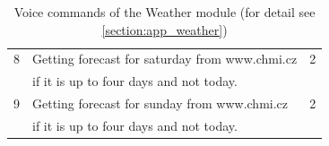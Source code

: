 \begin{table}[H]
{\begin{tabular}{|l|l|l|}
        \multicolumn{1}{|l|}{8} & \multicolumn{1}{l|}{Getting forecast for saturday from www.chmi.cz} & \multicolumn{1}{l|}{2} \\ 
        \multicolumn{1}{|l|}{} & \multicolumn{1}{l|}{if it is up to four days and not today.}                                           & \multicolumn{1}{l|}{} \\ \hline
        \multicolumn{1}{|l|}{9} & \multicolumn{1}{l|}{Getting forecast for sunday from www.chmi.cz}   & \multicolumn{1}{l|}{2} \\ 
        \multicolumn{1}{|l|}{} & \multicolumn{1}{l|}{if it is up to four days and not today.}                                           & \multicolumn{1}{l|}{} \\ \hline
    \end{tabular}}
    \caption{Voice commands of the Weather module (for detail see \cref{section:app_weather})} 
\end{table} 
